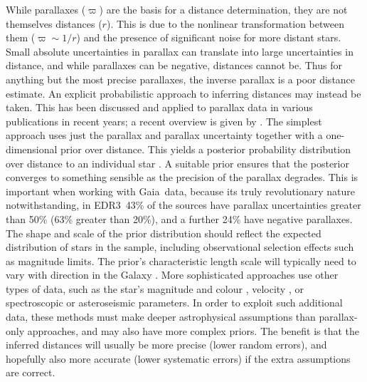 \documentclass[twocolumn]{aastex62}
\providecommand{\gaia}{Gaia}
\providecommand{\release}{EDR3}
\providecommand{\parallax}{\ensuremath{\varpi}}
\providecommand{\dist}{\ensuremath{r}}
\begin{document}
While parallaxes (\parallax) are the basis for a distance determination, they are not themselves distances (\dist). 
This is due to the nonlinear transformation between them 
($\parallax \sim 1/\dist$)
and the presence of significant noise for more distant stars.  Small absolute uncertainties in parallax can translate into large uncertainties in distance, and while parallaxes can be negative, distances cannot be. 
Thus for anything but the most precise parallaxes, the inverse parallax is a poor distance estimate.
An explicit probabilistic approach to inferring distances may instead be taken.
This has been discussed and applied to parallax data in various publications in recent years; a recent overview is given by \cite{2018A&A...616A...9L}.
The simplest approach uses just the parallax and parallax uncertainty together with a one-dimensional prior over distance. This yields a posterior probability distribution over distance to an individual star \citep{2015PASP..127..994B}. A suitable prior ensures that the posterior converges to something sensible as the precision of the parallax degrades. This is important when working with \gaia\ data,
because its truly revolutionary nature notwithstanding, in \release\ 
43\% of the sources 
have parallax uncertainties greater than 50\% (63\% greater than 20\%), and a further 24\% have negative parallaxes.
The shape and scale of the prior distribution should reflect the expected distribution of stars in the sample, including observational selection effects such as magnitude limits. The prior's characteristic length scale will typically need to vary with direction in the Galaxy \citep{2018AJ....156...58B}.
More sophisticated approaches use other types of data,  
such as the star's magnitude and colour
\citep{2016ApJ...832..137A, 2018RNAAS...2...51M, 2019A&A...628A..94A, 2019MNRAS.489.2079L},
velocity \citep{2017MNRAS.472.3979S, 2018ApJ...869...83Z}, 
or spectroscopic \citep{2018MNRAS.481.4093S, 2020A&A...638A..76Q}
or asteroseismic \citep{2019MNRAS.486.3569H} parameters. In order to exploit such additional data, these
methods must make deeper astrophysical assumptions than parallax-only approaches, and may also have more complex priors. The benefit is that the inferred distances will usually be more precise (lower random errors), and hopefully also more accurate (lower systematic errors) if the extra assumptions are correct.
\end{document}
